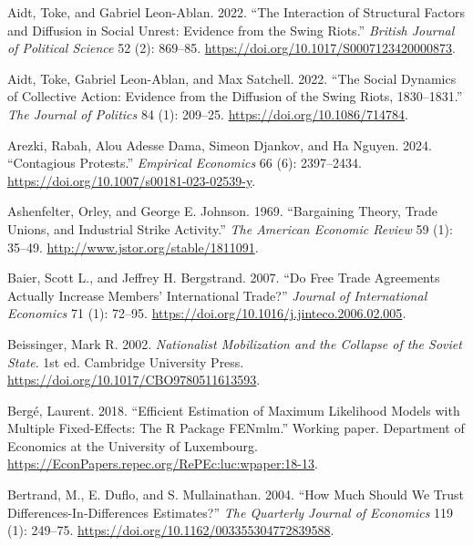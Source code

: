 \documentclass[
  11pt,
]{article}
\newlength{\cslhangindent}
\newenvironment{CSLReferences}[2] %
 {\begin{list}{}{%
  \setlength{\itemindent}{0pt}
  \setlength{\leftmargin}{0pt}
  \setlength{\parsep}{0pt}
  \ifodd #1
   \setlength{\leftmargin}{\cslhangindent}
   \setlength{\itemindent}{-1\cslhangindent}
  \fi
  \setlength{\itemsep}{#2\baselineskip}}}
 {\end{list}}
\begin{document}
\label{refs}
\begin{CSLReferences}{1}{0}
Aidt, Toke, and Gabriel Leon-Ablan. 2022. {``The {Interaction} of
{Structural Factors} and {Diffusion} in {Social Unrest}: {Evidence} from
the {Swing Riots}.''} \emph{British Journal of Political Science} 52
(2): 869--85. \url{https://doi.org/10.1017/S0007123420000873}.

Aidt, Toke, Gabriel Leon-Ablan, and Max Satchell. 2022. {``The {Social
Dynamics} of {Collective Action}: {Evidence} from the {Diffusion} of the
{Swing Riots}, 1830--1831.''} \emph{The Journal of Politics} 84 (1):
209--25. \url{https://doi.org/10.1086/714784}.

Arezki, Rabah, Alou Adesse Dama, Simeon Djankov, and Ha Nguyen. 2024.
{``Contagious Protests.''} \emph{Empirical Economics} 66 (6):
2397--2434. \url{https://doi.org/10.1007/s00181-023-02539-y}.

Ashenfelter, Orley, and George E. Johnson. 1969. {``Bargaining {Theory},
{Trade Unions}, and {Industrial Strike Activity}.''} \emph{The American
Economic Review} 59 (1): 35--49.
\url{http://www.jstor.org/stable/1811091}.

Baier, Scott L., and Jeffrey H. Bergstrand. 2007. {``Do Free Trade
Agreements Actually Increase Members' International Trade?''}
\emph{Journal of International Economics} 71 (1): 72--95.
\url{https://doi.org/10.1016/j.jinteco.2006.02.005}.

Beissinger, Mark R. 2002. \emph{Nationalist {Mobilization} and the
{Collapse} of the {Soviet State}}. 1st ed. Cambridge University Press.
\url{https://doi.org/10.1017/CBO9780511613593}.

Bergé, Laurent. 2018. {``Efficient Estimation of Maximum Likelihood
Models with Multiple Fixed-Effects: The {R} Package {FENmlm}.''} Working
paper. Department of Economics at the University of Luxembourg.
\url{https://EconPapers.repec.org/RePEc:luc:wpaper:18-13}.

Bertrand, M., E. Duflo, and S. Mullainathan. 2004. {``How {Much Should
We Trust Differences-In-Differences Estimates}?''} \emph{The Quarterly
Journal of Economics} 119 (1): 249--75.
\url{https://doi.org/10.1162/003355304772839588}.


\end{CSLReferences}
\end{document}
